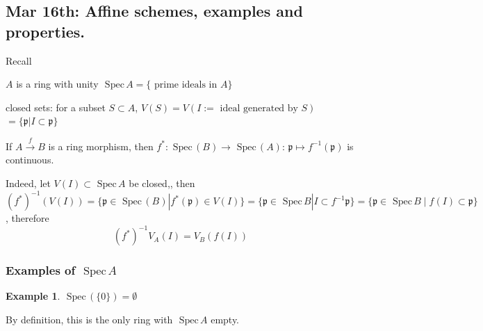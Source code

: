 \documentclass[11pt]{article}
\theoremstyle{definition}
\newtheorem{ex}[thm]{Example}
\newcommand{\spec}{\text{ Spec}\,}
\newcommand{\scp}{{\mathfrak p}}
\newcommand{\lrta}{\longrightarrow}
\begin{document}
\subsection{Mar 16th: Affine schemes, examples and properties.}
Recall

$A$ is a ring with unity
$\spec A=\{\text{ prime ideals in $A$}\}$

closed sets: for a subset $S\subset A$,
$V(S)=V(I:=\text{ ideal generated by $S$})$ $=\{\scp|I\subset \scp\}$

If $A\overset{f}{\lrta} B$ is a ring morphism, then $f^*:\spec(B)\lrta \spec (A)$: $\scp\mapsto f^{-1}(\scp)$ is continuous.

Indeed, let $V(I)\subset \spec A$ be closed,, then $(f^{*})^{-1}(V(I))=\{\scp\in\spec (B)|f^*(\scp)\in V(I)\}=\{\scp\in\spec B|I\subset f^{-1}\scp\}=\{\scp \in \spec B\mid f(I)\subset \scp\}$, therefore
$$
(f^{*})^{-1}V_A(I)=V_B(f(I))
$$

\subsubsection{Examples of $\spec A$}
\begin{ex}
$\spec (\{0\})=\emptyset$

By definition, this is the only ring with $\spec A$ empty.
\end{ex}
\end{document}
